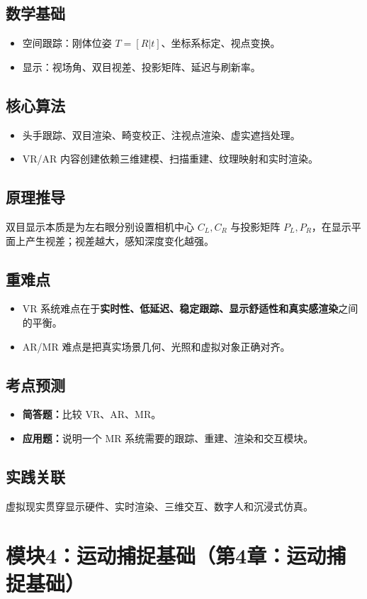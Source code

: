 \documentclass[UTF8,fontset=fandol,11pt]{ctexart}
\newcommand{\key}[1]{\textbf{#1}}
\newcommand{\exam}[1]{\textcolor{blue!55!black}{\textbf{#1}}}
\begin{document}
\subsection{数学基础}
\begin{itemize}
  \item 空间跟踪：刚体位姿 $T=[R|t]$、坐标系标定、视点变换。
  \item 显示：视场角、双目视差、投影矩阵、延迟与刷新率。
\end{itemize}
\subsection{核心算法}
\begin{itemize}
  \item 头手跟踪、双目渲染、畸变校正、注视点渲染、虚实遮挡处理。
  \item VR/AR 内容创建依赖三维建模、扫描重建、纹理映射和实时渲染。
\end{itemize}
\subsection{原理推导}
双目显示本质是为左右眼分别设置相机中心 $C_L,C_R$ 与投影矩阵 $P_L,P_R$，在显示平面上产生视差；视差越大，感知深度变化越强。
\subsection{重难点}
\begin{itemize}
  \item VR 系统难点在于\key{实时性、低延迟、稳定跟踪、显示舒适性和真实感渲染}之间的平衡。
  \item AR/MR 难点是把真实场景几何、光照和虚拟对象正确对齐。
\end{itemize}
\subsection{考点预测}
\begin{itemize}
  \item \exam{简答题：}比较 VR、AR、MR。
  \item \exam{应用题：}说明一个 MR 系统需要的跟踪、重建、渲染和交互模块。
\end{itemize}
\subsection{实践关联}
虚拟现实贯穿显示硬件、实时渲染、三维交互、数字人和沉浸式仿真。

\section{模块4：运动捕捉基础（第4章：运动捕捉基础）}
\end{document}
